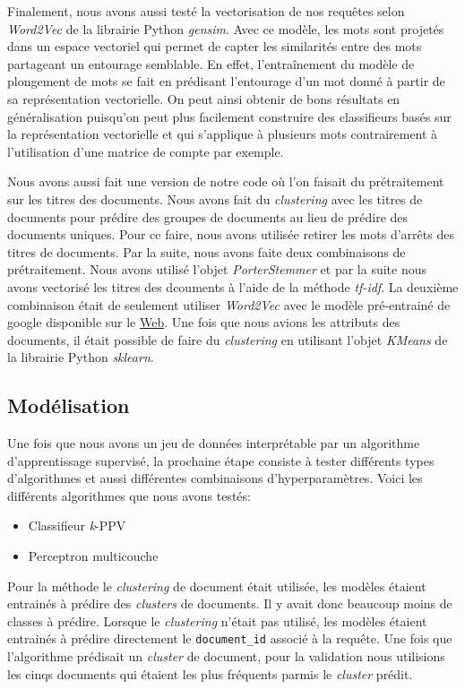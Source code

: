 Finalement, nous avons aussi testé la vectorisation de nos requêtes selon \textit{Word2Vec} de la librairie Python \textit{gensim}.
Avec ce modèle, les mots sont projetés dans un espace vectoriel qui permet de capter les similarités entre des mots partageant un entourage semblable. En effet, l'entraînement du modèle de plongement de mots se fait en prédisant l'entourage d'un mot donné à partir de sa représentation vectorielle. On peut ainsi obtenir de bons résultats en généralisation puisqu'on peut plus facilement construire des classifieurs basés sur la représentation vectorielle et qui s'applique à plusieurs mots contrairement à l'utilisation d'une matrice de compte par exemple.

Nous avons aussi fait une version de notre code où l'on faisait du prétraitement sur les titres des documents. Nous avons fait du \textit{clustering} avec les titres de documents pour prédire des groupes de documents au lieu de prédire des documents uniques. Pour ce faire, nous avons utilisée retirer les mots d'arrêts des titres de documents. Par la suite, nous avons faite deux combinaisons de prétraitement. Nous avons utilisé l'objet \textit{PorterStemmer} et par la suite nous avons vectorisé les titres des dcouments à l'aide de la méthode \textit{tf-idf}. La deuxième combinaison était de seulement utiliser \textit{Word2Vec} avec le modèle pré-entrainé de google disponible sur le \href{https://code.google.com/archive/p/word2vec/}{Web}. Une fois que nous avions les attributs des documents, il était possible de faire du \textit{clustering} en utilisant l'objet \textit{KMeans} de la librairie Python \textit{sklearn}. 

\subsection{Modélisation}

Une fois que nous avons un jeu de données interprétable par un algorithme d'apprentissage supervisé, la prochaine étape consiste à tester différents types d'algorithmes et aussi différentes combinaisons d'hyperparamètres. Voici les différents algorithmes que nous avons testés:

\begin{itemize}
  \item Classifieur \textit{k}-PPV
  \item Perceptron multicouche
\end{itemize}

Pour la méthode le \textit{clustering} de document était utilisée, les modèles étaient entrainés à prédire des \textit{clusters} de documents. Il y avait donc beaucoup moins de classes à prédire. Lorsque le \textit{clustering} n'était pas utilisé, les modèles étaient entrainés à prédire directement le \texttt{document_id} associé à la requête. Une fois que l'algorithme prédisait un \textit{cluster} de document, pour la validation nous utilisions les cinqs documents qui étaient les plus fréquents parmis le \textit{cluster} prédit.

